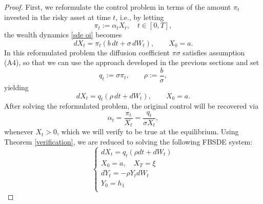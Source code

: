 \documentclass[10pt,a4paper]{amsart}
\begin{document}
\begin{proof}
First, we reformulate the control problem in terms of the amount $\pi_t$ invested
in the risky asset at time $t$, i.e., by letting
\[
\pi_t:=\alpha_tX_t, \quad t\in [0,T],
\]
the wealth dynamics \eqref{sde oi} becomes
\[
dX_t=\pi_t(b\,dt+\sigma\,dW_t),\qquad X_0=a.
\]
In this reformulated problem the diffusion coefficient \(\pi \sigma\) satisfies assumption (A4), so that we can use the approach developed in the previous sections and set
\[
q_t:=\sigma\pi_t,
\qquad \rho:=\frac b\sigma,
\]
yielding
\[
dX_t=q_t(\rho\,dt+dW_t),\qquad X_0=a.
\]
After solving the reformulated problem, the original control will be recovered via
\[
\alpha_t=\frac{\pi_t}{X_t}=\frac{q_t}{\sigma X_t},
\]
whenever \(X_t>0\), which we will verify to be true at the equilibrium. Using Theorem \ref{verification}, we are reduced to solving the following FBSDE system:
\begin{equation}
\label{FBSDE general 1 oi}
\begin{cases}
    dX_t=  q_t (\rho dt+ dW_t)\\
    X_0=a, \quad X_T=\xi\\
     dY_t=-\rho Y_t dW_t\\
    Y_0=h_1\\
        

\end{cases}
\end{equation}
\end{proof}
\end{document}
